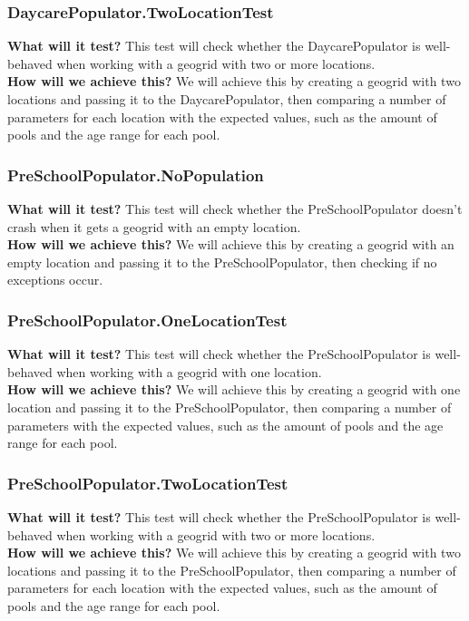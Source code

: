 \documentclass{article}
\begin{document}
\subsubsection{DaycarePopulator.TwoLocationTest}
\textbf{What will it test?}
This test will check whether the DaycarePopulator is well-behaved when working with a geogrid with two or more locations. \\
\newline
\textbf{How will we achieve this?}
We will achieve this by creating a geogrid with two locations and passing it to the DaycarePopulator, then comparing a number of parameters for each location with the expected values, such as the amount of pools and the age range for each pool.

\subsubsection{PreSchoolPopulator.NoPopulation}
\textbf{What will it test?}
This test will check whether the PreSchoolPopulator doesn't crash when it gets a geogrid with an empty location. \\
\newline
\textbf{How will we achieve this?}
We will achieve this by creating a geogrid with an empty location and passing it to the PreSchoolPopulator, then checking if no exceptions occur.

\subsubsection{PreSchoolPopulator.OneLocationTest}
\textbf{What will it test?}
This test will check whether the PreSchoolPopulator is well-behaved when working with a geogrid with one location. \\
\newline
\textbf{How will we achieve this?}
We will achieve this by creating a geogrid with one location and passing it to the PreSchoolPopulator, then comparing a number of parameters with the expected values, such as the amount of pools and the age range for each pool.

\subsubsection{PreSchoolPopulator.TwoLocationTest}
\textbf{What will it test?}
This test will check whether the PreSchoolPopulator is well-behaved when working with a geogrid with two or more locations. \\
\newline
\textbf{How will we achieve this?}
We will achieve this by creating a geogrid with two locations and passing it to the PreSchoolPopulator, then comparing a number of parameters for each location with the expected values, such as the amount of pools and the age range for each pool.
\end{document}
